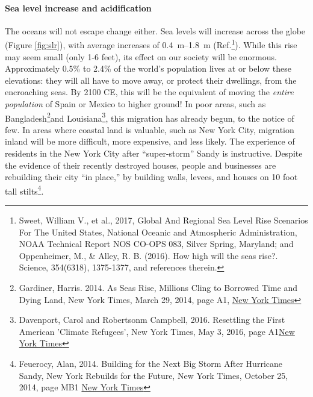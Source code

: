 \paragraph{Sea level increase and acidification}\label{sl_acid}
The oceans will not escape change either. Sea levels will increase across the globe (Figure \ref{fig:slr}), with average increases of \SIrange{0.4}{1.8}{\metre} (Ref.\footnote{Sweet, William V., et al., 2017, Global And Regional Sea Level Rise Scenarios For The United States, National Oceanic and Atmospheric Administration, NOAA Technical Report NOS CO-OPS 083, Silver Spring, Maryland; and Oppenheimer, M., \& Alley, R. B. (2016). How high will the seas rise?. Science, 354(6318), 1375-1377, and references therein.}). While this rise may seem small (only 1-6 feet), its effect on our society will be enormous. Approximately 0.5\% to 2.4\% of the world's population lives at or below these elevations: they will all have to move away, or protect their dwellings, from the encroaching seas. By 2100 CE, this will be the equivalent of moving the \emph{entire population} of Spain or Mexico to higher ground! In poor areas, such as Bangladesh\footnote{Gardiner, Harris. 2014. As Seas Rise, Millions Cling to Borrowed Time and Dying Land, New York Times, March 29, 2014, page A1, \href{https://www.nytimes.com/2014/03/29/world/asia/facing-rising-seas-bangladesh-confronts-the-consequences-of-climate-change.html}{New York Times}}and Louisiana\footnote{Davenport, Carol and Robertsonm Campbell, 2016. Resettling the First American 'Climate Refugees', New York Times, May 3, 2016, page A1\href{https://www.nytimes.com/2016/05/03/us/resettling-the-first-american-climate-refugees.html}{New York Times}}, this migration has already begun, to the notice of few. In areas where coastal land is valuable, such as New York City, migration inland will be  more difficult, more expensive, and less likely. The experience of residents in the New York City after ``super-storm'' Sandy is instructive. Despite the evidence of their recently destroyed houses, people and businesses are rebuilding their city ``in place,'' by building walls, levees, and houses on 10 foot tall stilts\footnote{Feuerocy, Alan, 2014. Building for the Next Big Storm After Hurricane Sandy, New York Rebuilds for the Future, New York Times, October 25, 2014, page MB1 \href{https://www.nytimes.com/2014/10/26/nyregion/after-hurricane-sandy-new-york-rebuilds-for-the-future.html}{New York Times}}. \\

